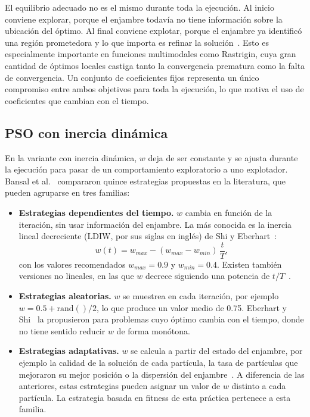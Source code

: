 El equilibrio adecuado no es el mismo durante toda la ejecución. Al inicio conviene explorar, porque el enjambre todavía no tiene información sobre la ubicación del óptimo. Al final conviene explotar, porque el enjambre ya identificó una región prometedora y lo que importa es refinar la solución~\cite{shi1999empirical, zhan2009adaptive}. Esto es especialmente importante en funciones multimodales como Rastrigin, cuya gran cantidad de óptimos locales castiga tanto la convergencia prematura como la falta de convergencia. Un conjunto de coeficientes fijos representa un único compromiso entre ambos objetivos para toda la ejecución, lo que motiva el uso de coeficientes que cambian con el tiempo.

\subsection{PSO con inercia dinámica}
\label{sec:inercia_dinamica}

En la variante con inercia dinámica, $w$ deja de ser constante y se ajusta durante la ejecución para pasar de un comportamiento exploratorio a uno explotador. Bansal et al.~\cite{bansal2011inertia} compararon quince estrategias propuestas en la literatura, que pueden agruparse en tres familias:

\begin{itemize}
    \item \textbf{Estrategias dependientes del tiempo.} $w$ cambia en función de la iteración, sin usar información del enjambre. La más conocida es la inercia lineal decreciente (LDIW, por sus siglas en inglés) de Shi y Eberhart~\cite{shi1999empirical}:
    \begin{equation}
        w(t) = w_{max} - (w_{max} - w_{min})\,\frac{t}{T},
        \label{eq:ldiw}
    \end{equation}
    con los valores recomendados $w_{max} = 0.9$ y $w_{min} = 0.4$. Existen también versiones no lineales, en las que $w$ decrece siguiendo una potencia de $t/T$~\cite{chatterjee2006nonlinear}.

    \item \textbf{Estrategias aleatorias.} $w$ se muestrea en cada iteración, por ejemplo $w = 0.5 + \mathrm{rand}()/2$, lo que produce un valor medio de 0.75. Eberhart y Shi~\cite{eberhart2001tracking} la propusieron para problemas cuyo óptimo cambia con el tiempo, donde no tiene sentido reducir $w$ de forma monótona.

    \item \textbf{Estrategias adaptativas.} $w$ se calcula a partir del estado del enjambre, por ejemplo la calidad de la solución de cada partícula, la tasa de partículas que mejoraron su mejor posición o la dispersión del enjambre~\cite{nickabadi2011novel, zhan2009adaptive}. A diferencia de las anteriores, estas estrategias pueden asignar un valor de $w$ distinto a cada partícula. La estrategia basada en fitness de esta práctica pertenece a esta familia.
\end{itemize}

